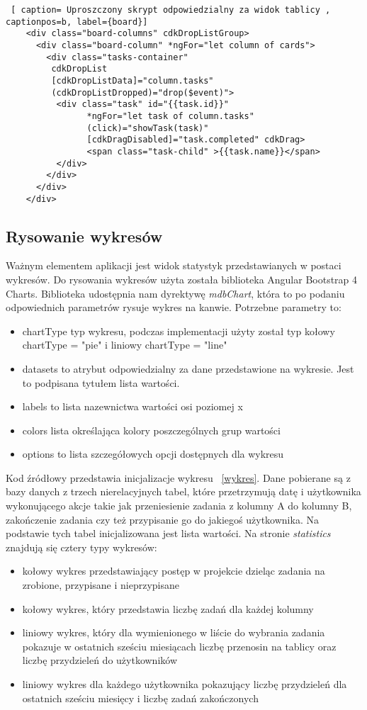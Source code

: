 \begin{lstlisting} [ caption= Uproszczony skrypt odpowiedzialny za widok tablicy , captionpos=b, label={board}]
	<div class="board-columns" cdkDropListGroup>
	  <div class="board-column" *ngFor="let column of cards">
	    <div class="tasks-container"
	     cdkDropList
	     [cdkDropListData]="column.tasks"
	     (cdkDropListDropped)="drop($event)">	
	      <div class="task" id="{{task.id}}" 
                *ngFor="let task of column.tasks" 
                (click)="showTask(task)" 
                [cdkDragDisabled]="task.completed" cdkDrag>
                <span class="task-child" >{{task.name}}</span>
	      </div>
	    </div>
	  </div>
	</div>
\end{lstlisting}
\clearpage
\subsection{Rysowanie wykresów}
Ważnym elementem aplikacji jest widok statystyk przedstawianych w postaci wykresów. Do rysowania wykresów użyta została biblioteka Angular Bootstrap 4 Charts. Biblioteka udostępnia nam dyrektywę \textit{mdbChart},
która to po podaniu odpowiednich parametrów rysuje wykres na kanwie. \cite{MdbAngularBootstrap} Potrzebne parametry to:
\begin{itemize}
	\item chartType typ wykresu, podczas implementacji użyty został typ kołowy chartType = "pie" i liniowy chartType = "line"
	\item datasets to atrybut odpowiedzialny za dane przedstawione na wykresie. Jest to podpisana tytułem lista wartości.
	\item labels to lista nazewnictwa wartości osi poziomej x
	\item colors lista określająca kolory poszczególnych grup wartości
	\item options to lista szczegółowych opcji dostępnych dla wykresu
\end{itemize}
Kod źródłowy przedstawia inicjalizacje wykresu ~\ref{wykres}. Dane pobierane są z bazy danych z trzech nierelacyjnych tabel, które przetrzymują datę i użytkownika wykonującego akcje takie jak przeniesienie zadania z kolumny A do kolumny B, zakończenie zadania czy też przypisanie go do jakiegoś użytkownika. Na podstawie tych tabel inicjalizowana jest lista wartości. Na stronie \textit{statistics} znajdują się cztery typy wykresów:
\begin{itemize}
	\item kołowy wykres przedstawiający postęp w projekcie dzieląc zadania na zrobione, przypisane i nieprzypisane
	\item kołowy wykres, który przedstawia liczbę zadań dla każdej kolumny
	\item liniowy wykres, który dla wymienionego w liście do wybrania zadania pokazuje w ostatnich sześciu miesiącach liczbę przenosin na tablicy oraz liczbę przydzieleń do użytkowników
	\item liniowy wykres dla każdego użytkownika pokazujący liczbę przydzieleń dla ostatnich sześciu miesięcy i liczbę zadań zakończonych
\end{itemize}


